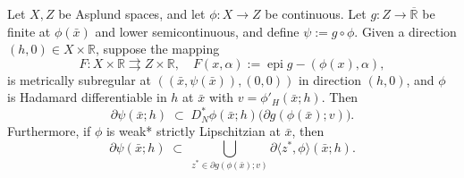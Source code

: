 \documentclass[10pt,a4paper]{amsart}
\begin{document}
\begin{theorem}\label{thm: chain rule}
Let \( X, Z \) be Asplund spaces, and let \( \phi : X \to Z \) be continuous.  
Let \( g : Z \to \overline{\mathbb{R}} \) be finite at \( \phi(\bar{x}) \) and lower semicontinuous, and define \( \psi := g \circ \phi \).  
Given a direction \( (h, 0) \in X \times \mathbb{R} \), suppose the mapping
\[
    F : X \times \mathbb{R} \rightrightarrows Z \times \mathbb{R}, 
    \quad F(x, \alpha) := \operatorname{epi} g - (\phi(x), \alpha),
\]
is metrically subregular at \( ((\bar{x}, \psi(\bar{x})), (0,0)) \) in direction \( (h, 0) \), and $\phi$ is Hadamard differentiable in $h$ at $\bar x$ with \( v = \phi'_H(\bar{x}; h) \).  
Then
\begin{equation}\label{eq:chain_rule_unscalarized}
    \partial \psi(\bar{x}; h)
    \;\subset\;
    D^*_N \phi(\bar{x}; h) \big( \partial g(\phi(\bar{x}); v)\big).
\end{equation}
Furthermore, if $\phi$ is weak* strictly Lipschitzian at $\bar{x}$, then 
\begin{equation}\label{eq:chain_rule}
    \partial \psi(\bar{x}; h)
    \;\subset\;\bigcup\limits_{z^*\in \partial g(\phi(\bar{x}); v)} \partial \langle z^*, \phi\rangle(\bar{x}; h).
\end{equation}
\end{theorem}
\end{document}
